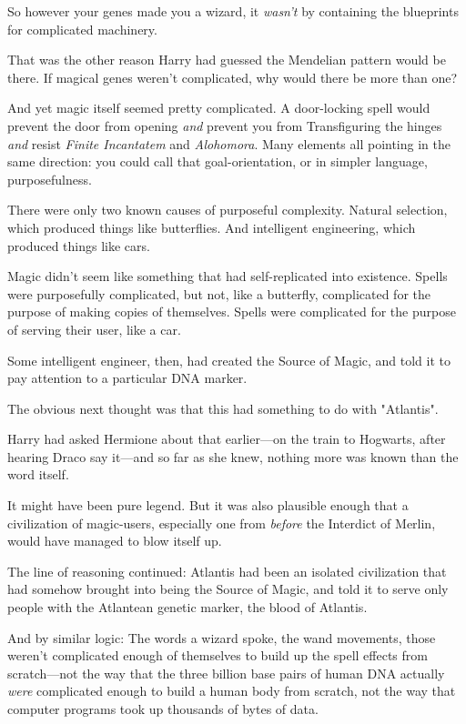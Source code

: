 So however your genes made you a wizard, it \emph{wasn't} by containing the 
blueprints for complicated machinery.

That was the other reason Harry had guessed the Mendelian pattern would be 
there. If magical genes weren't complicated, why would there be more than one?

And yet magic itself seemed pretty complicated. A door-locking spell would 
prevent the door from opening \emph{and} prevent you from Transfiguring the 
hinges \emph{and} resist \emph{Finite Incantatem} and \emph{Alohomora}. Many 
elements all pointing in the same direction: you could call that 
goal-orientation, or in simpler language, purposefulness.

There were only two known causes of purposeful complexity. Natural selection, 
which produced things like butterflies. And intelligent engineering, which 
produced things like cars.

Magic didn't seem like something that had self-replicated into existence. 
Spells were purposefully complicated, but not, like a butterfly, complicated 
for the purpose of making copies of themselves. Spells were complicated for the 
purpose of serving their user, like a car.

Some intelligent engineer, then, had created the Source of Magic, and told it 
to pay attention to a particular DNA marker.

The obvious next thought was that this had something to do with "Atlantis".

Harry had asked Hermione about that earlier---on the train to Hogwarts, after 
hearing Draco say it---and so far as she knew, nothing more was known than the 
word itself.

It might have been pure legend. But it was also plausible enough that a 
civilization of magic-users, especially one from \emph{before} the Interdict of 
Merlin, would have managed to blow itself up.

The line of reasoning continued: Atlantis had been an isolated civilization 
that had somehow brought into being the Source of Magic, and told it to serve 
only people with the Atlantean genetic marker, the blood of Atlantis.

And by similar logic: The words a wizard spoke, the wand movements, those 
weren't complicated enough of themselves to build up the spell effects from 
scratch---not the way that the three billion base pairs of human DNA actually 
\emph{were} complicated enough to build a human body from scratch, not the way 
that computer programs took up thousands of bytes of data.

